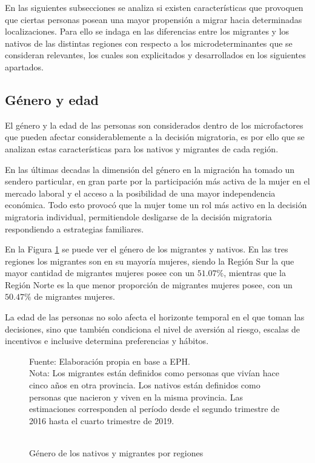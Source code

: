 \documentclass[12pt,a4paper]{article}
\begin{document}
En las siguientes subsecciones se analiza si existen características que provoquen que ciertas personas posean una mayor propensión a migrar hacia determinadas localizaciones. Para ello se indaga en las diferencias entre los migrantes y los nativos de las distintas regiones con respecto a los microdeterminantes que se consideran relevantes, los cuales son explicitados y desarrollados en los siguientes apartados.


\subsection{Género y edad}
El género y la edad de las personas son considerados dentro de los microfactores que pueden afectar considerablemente a la decisión migratoria, es por ello que se analizan estas características para los nativos y migrantes de cada región.

En las últimas decadas la dimensión del género en la migración ha tomado un sendero particular, en gran parte por la participación más activa de la mujer en el mercado laboral y el acceso a la posibilidad de una mayor independencia económica. Todo esto provocó que la mujer tome un rol más activo en la decisión migratoria individual, permitiendole desligarse de la decisión migratoria respondiendo a estrategias  familiares.


En la Figura \ref{figure:sexo_mig_} se puede ver el género de los migrantes y nativos. En las tres regiones los migrantes son en su mayoría mujeres, siendo la Región Sur la que mayor cantidad de migrantes mujeres posee con un $51.07\%$, mientras que la Región Norte es la que menor proporción de migrantes mujeres posee, con un $50.47\%$ de migrantes mujeres.

La edad de las personas no solo afecta el horizonte temporal en el que toman las decisiones, sino que también condiciona el nivel de aversión al riesgo, escalas de incentivos e inclusive determina preferencias y hábitos.

\begin{figure}[ht!]
\begin{center}
 	\caption{\\Género de los nativos y migrantes por regiones}
 
 	\label{figure:sexo_mig_}
\begin{flushleft}
\begin{scriptsize}
Fuente: Elaboración propia en base a EPH.\\
Nota: Los migrantes están definidos como personas que vivían hace cinco años en otra provincia. Los nativos están definidos como personas que nacieron y viven en la misma provincia. Las estimaciones corresponden al período desde el segundo trimestre de 2016 hasta el cuarto trimestre de 2019.\\
\end{scriptsize}
\end{flushleft}
\end{center}
\end{figure}
\newpage
\end{document}

